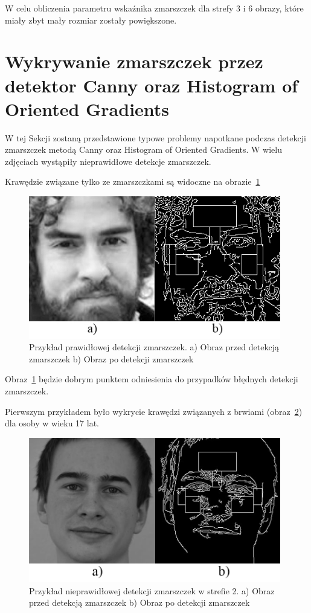 \documentclass[a4paper,twoside,12pt]{book}
\begin{document}
    W celu obliczenia parametru wskaźnika zmarszczek dla strefy 3 i 6 obrazy, które miały zbyt mały rozmiar zostały powiększone.

    \section{Wykrywanie zmarszczek przez detektor Canny oraz Histogram of Oriented Gradients}\label{sec:wykrywanie-krawędzi-przez-detektor-canny}
    W tej Sekcji zostaną przedstawione typowe problemy napotkane podczas detekcji zmarszczek metodą Canny oraz Histogram
    of Oriented Gradients.
    W wielu zdjęciach wystąpiły nieprawidłowe detekcje zmarszczek.

    Krawędzie związane tylko ze zmarszczkami są widoczne na obrazie~\ref{fig.dobryRyjek}
    \begin{figure}[hp]
        \centering
        \includegraphics[width=11cm]{Obrazy/dobryRyjekWszystkieStrefyGray.jpg}
        \captionsetup{justification=centering}
        \caption{Przykład prawidłowej detekcji zmarszczek. \newline
        a) Obraz przed detekcją zmarszczek b) Obraz po detekcji zmarszczek }
        \label{fig.dobryRyjek}
    \end{figure}
    Obraz~\ref{fig.dobryRyjek} będzie dobrym punktem odniesienia do przypadków błędnych detekcji zmarszczek.

    Pierwszym przykładem było wykrycie krawędzi związanych z brwiami (obraz~\ref{fig.zlyRyjek}) dla osoby w wieku 17
    lat.

    \begin{figure}
        \centering
        \includegraphics[width=11cm]{Obrazy/mojaTwarzGrayWszystieStrefy.jpg}
        \captionsetup{justification=centering}
        \caption{Przykład nieprawidłowej detekcji zmarszczek w strefie 2. \newline
        a) Obraz przed detekcją zmarszczek b) Obraz po detekcji zmarszczek }
        \label{fig.zlyRyjek}
    \end{figure}
\end{document}
